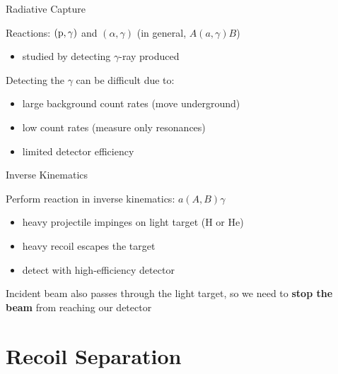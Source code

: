 \documentclass[10pt]{beamer}
\newcommand{\react}[4]{$#1(#2,#3)#4$}
\begin{document}
\begin{frame}[fragile]{Radiative Capture}

    Reactions: $({\rm p}, \gamma)$ and $(\alpha,\gamma)$ (in general, \react{A}{a}{\gamma}{B})
    \begin{itemize}
        \item studied by detecting $\gamma$-ray produced
    \end{itemize}


    Detecting the $\gamma$ can be difficult due to:
    \begin{itemize}
        \item large background count rates (move underground)
        \item low count rates (measure only resonances)
        \item limited detector efficiency
    \end{itemize}


\end{frame}

\begin{frame}[fragile]{Inverse Kinematics}

    Perform reaction in inverse kinematics: \react{a}{A}{B}{\gamma}

    \begin{itemize}
        \item heavy projectile impinges on light target (H or He)
        \item heavy recoil escapes the target
        \item detect with high-efficiency detector
    \end{itemize}

    Incident beam also passes through the light target, so we need to
    \textbf{stop the beam} from reaching our detector

\end{frame}

\section{Recoil Separation}
\end{document}
